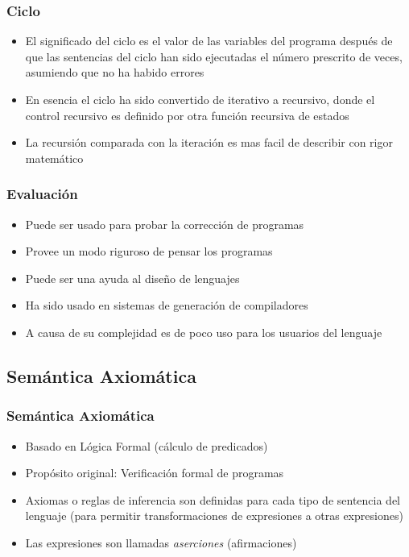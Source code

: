 \documentclass[11pt]{article}
\begin{document}
\subsubsection*{Ciclo}
\label{sec:org2b5240e}
\begin{itemize}
\item El significado del ciclo es el valor de las variables del programa
después de que las sentencias del ciclo han sido ejecutadas el
número prescrito de veces, asumiendo que no ha habido errores
\item En esencia el ciclo ha sido convertido de iterativo a recursivo,
donde el control recursivo es definido por otra función recursiva de estados
\item La recursión comparada con la iteración es mas facil de describir
con rigor matemático
\end{itemize}

\subsubsection*{Evaluación}
\label{sec:org75c80e9}
\begin{itemize}
\item Puede ser usado para probar la corrección de programas
\item Provee un modo riguroso de pensar los programas
\item Puede ser una ayuda al diseño de lenguajes
\item Ha sido usado en sistemas de generación de compiladores
\item A causa de su complejidad es de poco uso para los usuarios del lenguaje
\end{itemize}



\subsection*{Semántica Axiomática}
\label{sec:org75e1b8c}

\subsubsection*{Semántica Axiomática}
\label{sec:org2680c9e}
\begin{itemize}
\item Basado en Lógica Formal (cálculo de predicados)
\item Propósito original: Verificación formal de programas
\item Axiomas o reglas de inferencia son definidas para cada tipo de
sentencia del lenguaje (para permitir transformaciones de
expresiones a otras expresiones)
\item Las expresiones son llamadas \emph{aserciones} (afirmaciones)
\end{itemize}
\end{document}
